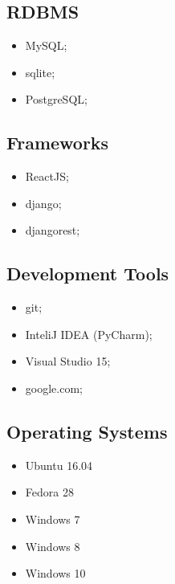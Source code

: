 \documentclass[12pt,a4paper,sans]{moderncv} %
\begin{document}
\subsection{RDBMS}
\begin{multicols}{3}
\begin{itemize}
\item MySQL; \item sqlite; \item PostgreSQL;
\end{itemize}
\end{multicols}
\newpage
\subsection{Frameworks}
\begin{multicols}{3}
\begin{itemize}
\item ReactJS; \item django; \item djangorest;
\end{itemize}
\end{multicols}
\subsection{Development Tools}
\begin{multicols}{2}
\begin{itemize}
\item git; \item InteliJ IDEA (PyCharm); \item Visual Studio 15;
\item google.com;
\end{itemize}
\end{multicols}
\subsection{Operating Systems}
\begin{multicols}{3}
\begin{itemize}
\item Ubuntu 16.04 \item Fedora 28 \item Windows 7 
\item Windows 8 \item Windows 10 
\end{itemize}
\end{multicols}
\end{document}
